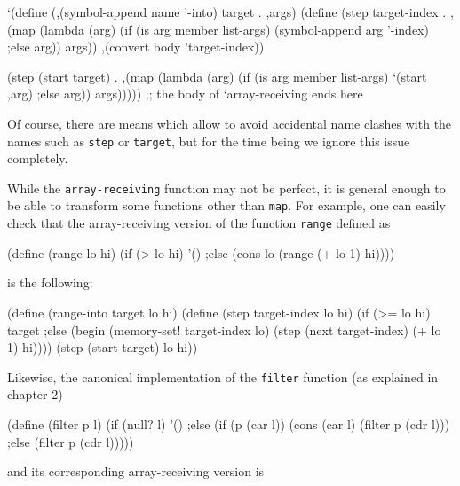 \begin{Snippet}
    `(define (,(symbol-append name '-into) target . ,args)
       (define (step target-index
                     . ,(map (lambda (arg)
			       (if (is arg member list-args)
			           (symbol-append arg '-index)
                               ;else
                                   arg))
			      args))
	 ,(convert body 'target-index))
\end{Snippet}
\begin{Snippet}
       (step (start target)
             . ,(map (lambda (arg)
		       (if (is arg member list-args)
		          `(start ,arg)
                       ;else
			  arg))
	             args)))))
       ;; the body of `array-receiving ends here
\end{Snippet}

Of course, there are means which allow to avoid accidental name
clashes with the names such as \texttt{step} or \texttt{target},
but for the time being we ignore this issue completely.

While the \texttt{array-receiving} function may not be perfect,
it is general enough to be able to transform some functions
other than \texttt{map}. For example, one can easily check
that the array-receiving version of the function \texttt{range}
defined as

\begin{Snippet}
  (define (range lo hi)
    (if (> lo hi)
        '()
    ;else
        (cons lo (range (+ lo 1) hi))))
\end{Snippet}

is the following:

\begin{Snippet}
(define (range-into target lo hi)
  (define (step target-index lo hi)
    (if (>= lo hi)
	target
    ;else
	(begin
	  (memory-set! target-index lo)
	  (step (next target-index) (+ lo 1) hi))))
  (step (start target) lo hi))
\end{Snippet}

Likewise, the canonical implementation of the \texttt{filter}
function (as explained in chapter 2)

\begin{Snippet}
(define (filter p l)
  (if (null? l)
      '()
  ;else
      (if (p (car l))
	  (cons (car l) (filter p (cdr l)))
      ;else
          (filter p (cdr l)))))
\end{Snippet}

and its corresponding array-receiving version is

